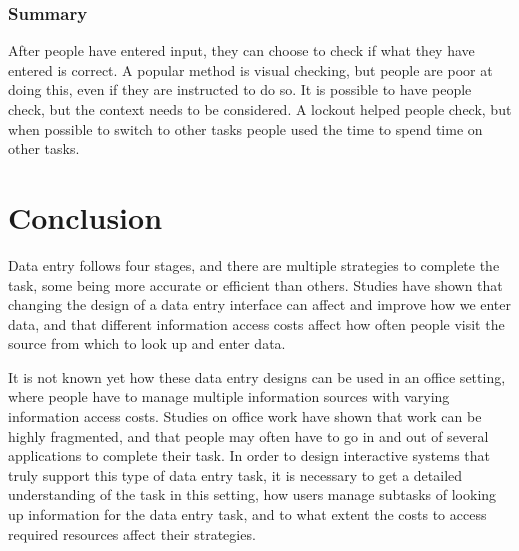 \subsubsection{Summary}
After people have entered input, they can choose to check if what they have entered is correct. A popular method is visual checking, but people are poor at doing this, even if they are instructed to do so. It is possible to have people check, but the context needs to be considered. A lockout helped people check, but when possible to switch to other tasks people used the time to spend time on other tasks.


\section{Conclusion}
Data entry follows four stages, and there are multiple strategies to complete the task, some being more accurate or efficient than others. Studies have shown that changing the design of a data entry interface can affect and improve how we enter data, and that different information access costs affect how often people visit the source from which to look up and enter data.

It is not known yet how these data entry designs can be used in an office setting, where people have to manage multiple information sources with varying information access costs. Studies on office work have shown that work can be highly fragmented, and that people may often have to go in and out of several applications to complete their task. 
In order to design interactive systems that truly support this type of data entry task, it is necessary to get a detailed understanding of the task in this setting, how users manage subtasks of looking up information for the data entry task, and to what extent the costs to access required resources affect their strategies.